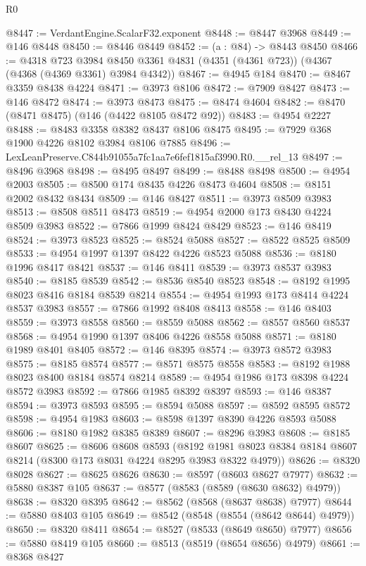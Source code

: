 \begin{lexlean}{R0}
\begin{coremodule}
@8447 := VerdantEngine.ScalarF32.exponent
@8448 := @8447 @3968
@8449 := @146 @8448
@8450 := @8446 @8449
@8452 := (a : @84) -> @8443 @8450
@8466 := @4318
    @723
    @3984
    @8450
    @3361
    @4831
    (@4351 (@4361 @723))
    (@4367 (@4368 (@4369 @3361) @3984 @4342))
@8467 := @4945 @184
@8470 := @8467 @3359 @8438 @4224
@8471 := @3973 @8106
@8472 := @7909 @8427
@8473 := @146 @8472
@8474 := @3973 @8473
@8475 := @8474 @4604
@8482 := @8470 (@8471 @8475) (@146 (@4422 @8105 @8472 @92))
@8483 := @4954 @2227
@8488 := @8483 @3358 @8382 @8437 @8106 @8475
@8495 := @7929 @368 @1900 @4226 @8102 @3984 @8106 @7885
@8496 := LexLeanPreserve.C844b91055a7fc1aa7e6fef1815af3990.R0.__rel_13
@8497 := @8496 @3968
@8498 := @8495 @8497
@8499 := @8488 @8498
@8500 := @4954 @2003
@8505 := @8500 @174 @8435 @4226 @8473 @4604
@8508 := @8151 @2002 @8432 @8434
@8509 := @146 @8427
@8511 := @3973 @8509 @3983
@8513 := @8508 @8511 @8473
@8519 := @4954 @2000 @173 @8430 @4224 @8509 @3983
@8522 := @7866 @1999 @8424 @8429
@8523 := @146 @8419
@8524 := @3973 @8523
@8525 := @8524 @5088
@8527 := @8522 @8525 @8509
@8533 := @4954 @1997 @1397 @8422 @4226 @8523 @5088
@8536 := @8180 @1996 @8417 @8421
@8537 := @146 @8411
@8539 := @3973 @8537 @3983
@8540 := @8185 @8539
@8542 := @8536 @8540 @8523
@8548 := @8192 @1995 @8023 @8416 @8184 @8539 @8214
@8554 := @4954 @1993 @173 @8414 @4224 @8537 @3983
@8557 := @7866 @1992 @8408 @8413
@8558 := @146 @8403
@8559 := @3973 @8558
@8560 := @8559 @5088
@8562 := @8557 @8560 @8537
@8568 := @4954 @1990 @1397 @8406 @4226 @8558 @5088
@8571 := @8180 @1989 @8401 @8405
@8572 := @146 @8395
@8574 := @3973 @8572 @3983
@8575 := @8185 @8574
@8577 := @8571 @8575 @8558
@8583 := @8192 @1988 @8023 @8400 @8184 @8574 @8214
@8589 := @4954 @1986 @173 @8398 @4224 @8572 @3983
@8592 := @7866 @1985 @8392 @8397
@8593 := @146 @8387
@8594 := @3973 @8593
@8595 := @8594 @5088
@8597 := @8592 @8595 @8572
@8598 := @4954 @1983
@8603 := @8598 @1397 @8390 @4226 @8593 @5088
@8606 := @8180 @1982 @8385 @8389
@8607 := @8296 @3983
@8608 := @8185 @8607
@8625 := @8606
    @8608
    @8593
    (@8192 @1981 @8023 @8384 @8184 @8607 @8214 (@8300 @173 @8031 @4224 @8295 @3983 @8322 @4979))
@8626 := @8320 @8028
@8627 := @8625 @8626
@8630 := @8597 (@8603 @8627 @7977)
@8632 := @5880 @8387 @105
@8637 := @8577 (@8583 (@8589 (@8630 @8632) @4979))
@8638 := @8320 @8395
@8642 := @8562 (@8568 (@8637 @8638) @7977)
@8644 := @5880 @8403 @105
@8649 := @8542 (@8548 (@8554 (@8642 @8644) @4979))
@8650 := @8320 @8411
@8654 := @8527 (@8533 (@8649 @8650) @7977)
@8656 := @5880 @8419 @105
@8660 := @8513 (@8519 (@8654 @8656) @4979)
@8661 := @8368 @8427

\end{coremodule}
\end{lexlean}
